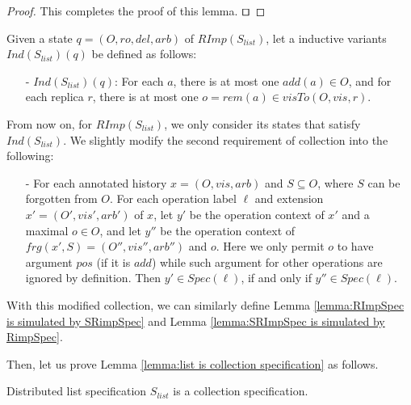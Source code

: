 \begin {proof}
This completes the proof of this lemma. $\qed$
\end {proof}

Given a state $q = (O,\mathit{ro},\mathit{del},\mathit{arb})$ of $\mathit{RImp}( S_{\mathit{list}} )$, let a inductive variants $\mathit{Ind}(S_{\mathit{list}})(q)$ be defined as follows:

\begin{itemize}
\setlength{\itemsep}{0.5pt}
\item[-] $\mathit{Ind}(S_{\mathit{list}})(q)$: For each $a$, there is at most one $\mathit{add}(a) \in O$, and for each replica $r$, there is at most one $o = \mathit{rem}(a) \in \mathit{visTo}(O,\mathit{vis},r)$.
\end{itemize}

From now on, for $\mathit{RImp}( S_{\mathit{list}} )$, we only consider its states that satisfy $\mathit{Ind}(S_{\mathit{list}})$. We slightly modify the second requirement of collection into the following:

\begin{itemize}
\setlength{\itemsep}{0.5pt}
\item[-] For each annotated history $x = (O,\mathit{vis},\mathit{arb})$ and $S \subseteq O$, where $S$ can be forgotten from $O$. For each operation label $\ell$ and extension $x' = (O',\mathit{vis}',\mathit{arb}')$ of $x$, let $y'$ be the operation context of $x'$ and a maximal $o \in O$, and let $y''$ be the operation context of $frg(x',S) = (O'',\mathit{vis}'',\mathit{arb}'')$ and $o$. Here we only permit $o$ to have argument $\mathit{pos}$ (if it is $\mathit{add}$) while such argument for other operations are ignored by definition. Then $y' \in Spec(\ell)$, if and only if $y'' \in Spec(\ell)$.
\end{itemize}

With this modified collection, we can similarly define Lemma \ref{lemma:RImpSpec is simulated by SRimpSpec} and Lemma \ref{lemma:SRImpSpec is simulated by RimpSpec}.

Then, let us prove Lemma \ref{lemma:list is collection specification} as follows.

\begin{lemma}
\label{lemma:list is collection specification}
Distributed list specification $S_{\mathit{list}}$ is a collection specification.

\end{lemma}

